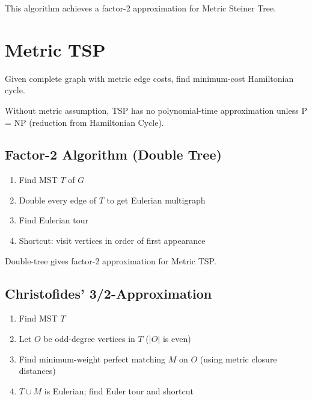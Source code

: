 \begin{theorem}
This algorithm achieves a factor-2 approximation for Metric Steiner Tree.
\end{theorem}

\section{Metric TSP}

\begin{definition}
Given complete graph with metric edge costs, find minimum-cost Hamiltonian cycle.
\end{definition}

Without metric assumption, TSP has no polynomial-time approximation unless P = NP (reduction from Hamiltonian Cycle).

\subsection{Factor-2 Algorithm (Double Tree)}

\begin{algorithmdef}
\begin{enumerate}
    \item Find MST $T$ of $G$
    \item Double every edge of $T$ to get Eulerian multigraph
    \item Find Eulerian tour
    \item Shortcut: visit vertices in order of first appearance
\end{enumerate}
\end{algorithmdef}

\begin{theorem}
Double-tree gives factor-2 approximation for Metric TSP.
\end{theorem}

\subsection{Christofides' 3/2-Approximation}

\begin{algorithmdef}
\begin{enumerate}
    \item Find MST $T$
    \item Let $O$ be odd-degree vertices in $T$ ($|O|$ is even)
    \item Find minimum-weight perfect matching $M$ on $O$ (using metric closure distances)
    \item $T \cup M$ is Eulerian; find Euler tour and shortcut
\end{enumerate}
\end{algorithmdef}

